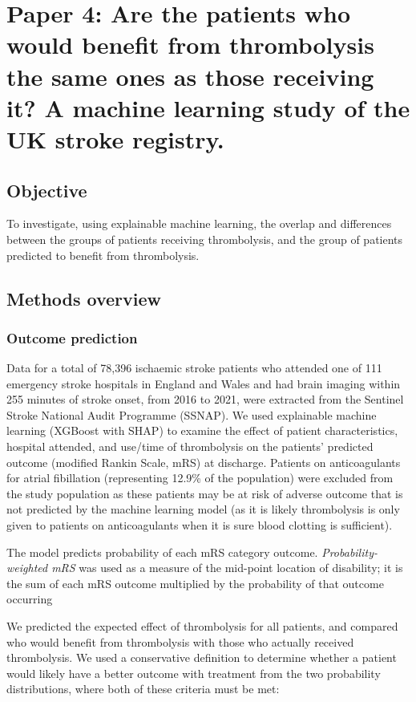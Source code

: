 \section{Paper 4: Are the patients who would benefit from thrombolysis the same ones as those receiving it? A machine learning study of the UK stroke registry.\cite{pearn_are_2024}}\label{sec:paper_4}

\subsection{Objective}

To investigate, using explainable machine learning, the overlap and differences between the groups of patients receiving thrombolysis, and the group of patients predicted to benefit from thrombolysis.

\subsection{Methods overview}

\subsubsection{Outcome prediction}

Data for a total of 78,396 ischaemic stroke patients who attended one of 111 emergency stroke hospitals in England and Wales and had brain imaging within 255 minutes of stroke onset, from 2016 to 2021, were extracted from the Sentinel Stroke National Audit Programme (SSNAP). We used explainable machine learning (XGBoost\cite{chen_xgboost_2016} with SHAP\cite{lundberg_unified_2017}) to examine the effect of patient characteristics, hospital attended, and use/time of thrombolysis on the patients’ predicted outcome (modified Rankin Scale, mRS) at discharge. Patients on anticoagulants for atrial fibillation (representing 12.9\% of the population) were excluded from the study population as these patients may be at risk of adverse outcome that is not predicted by the machine learning model (as it is likely thrombolysis is only given to patients on anticoagulants when it is sure blood clotting is sufficient).

The model predicts probability of each mRS category outcome.  \textit{Probability-weighted mRS} was used as a measure of the mid-point location of disability; it is the sum of each mRS outcome multiplied by the probability of that outcome occurring

We predicted the expected effect of thrombolysis for all patients, and compared who would benefit from thrombolysis with those who actually received thrombolysis. We used a conservative definition to determine whether a patient would likely have a better outcome with treatment from the two probability distributions, where both of these criteria must be met: 

